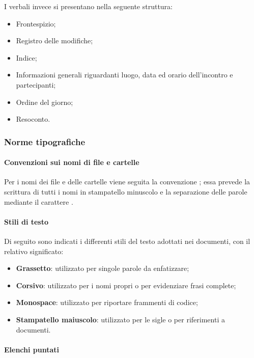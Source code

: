 I verbali invece si presentano nella seguente struttura:
\begin{itemize}
    \item Frontespizio;
    \item Registro delle modifiche;
    \item Indice;
    \item Informazioni generali riguardanti luogo, data ed orario dell'incontro e partecipanti;
    \item Ordine del giorno;
    \item Resoconto.
\end{itemize}

\subsubsection{Norme tipografiche}
\label{ssub:norme_tipografiche}

\paragraph{Convenzioni sui nomi di file e cartelle}
\label{par:attribuzione_nome}

Per i nomi dei file e delle cartelle viene seguita la convenzione ; essa prevede la scrittura di tutti i nomi in stampatello
minuscolo e la separazione delle parole mediante il carattere .

\paragraph{Stili di testo}
\label{par:stili_testo}

Di seguito sono indicati i differenti stili del testo adottati nei documenti, con il relativo significato:
\begin{itemize}
    \item \textbf{Grassetto}: utilizzato per singole parole da enfatizzare;
    \item \textbf{Corsivo}: utilizzato per i nomi propri o per evidenziare frasi complete;
    \item \textbf{Monospace}: utilizzato per riportare frammenti di codice;
    \item \textbf{Stampatello maiuscolo}: utilizzato per le sigle o per riferimenti a documenti.
\end{itemize}

\paragraph{Elenchi puntati}
\label{par:elenchi}

